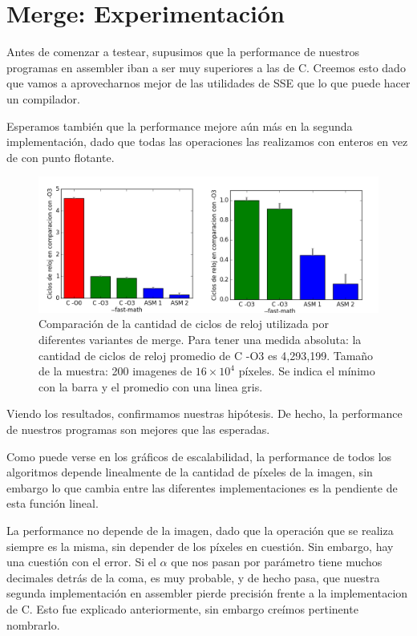 \section*{Merge: Experimentación}

Antes de comenzar a testear, supusimos que la performance de nuestros programas en assembler iban a ser muy superiores a las de C. Creemos esto dado que vamos a aprovecharnos mejor de las utilidades de SSE que lo que puede hacer un compilador. 

Esperamos también que la performance mejore aún más en la segunda implementación, dado que todas las operaciones las realizamos con enteros en vez de con punto flotante.


\begin{figure}[!hbt] 
  \centering
  \includegraphics[width=20cm]{merge-all.png}
  \caption{Comparación de la cantidad de ciclos de reloj utilizada por diferentes variantes de merge. Para tener una medida absoluta: la cantidad de ciclos de reloj promedio de C -O3 es 4,293,199. Tamaño de la muestra: 200 imagenes de $16 \times 10^4$ píxeles. Se indica el mínimo con la barra y el promedio con una linea gris.}
\end{figure}


Viendo los resultados, confirmamos nuestras hipótesis. De hecho, la performance de nuestros programas son mejores que las esperadas.

Como puede verse en los gráficos de escalabilidad, la performance de todos los algoritmos depende linealmente de la cantidad de píxeles de la imagen, sin embargo lo que cambia entre las diferentes implementaciones es la pendiente de esta función lineal.

La performance no depende de la imagen, dado que la operación que se realiza siempre es la misma, sin depender de los píxeles en cuestión.
Sin embargo, hay una cuestión con el error. Si el $\alpha$ que nos pasan por parámetro tiene muchos decimales detrás de la coma, es muy probable, y de hecho pasa, que nuestra segunda implementación en assembler pierde precisión frente a la implementacion de C. Esto fue explicado anteriormente, sin embargo creímos pertinente nombrarlo.

